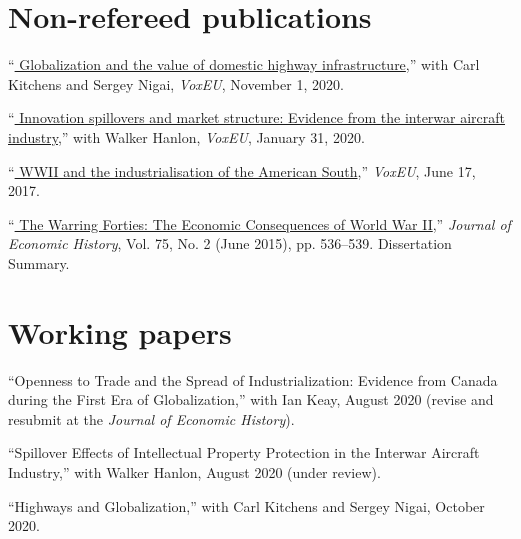 \documentclass[11pt,letterpaper]{article}
\begin{document}
\section*{Non-refereed publications}
\begin{description}[leftmargin=0in,itemsep=.25em,itemindent=.15in]
\item ``\href{https://voxeu.org/article/globalisation-and-value-domestic-highway-infrastructure}{\color{black}
		Globalization and the value of domestic highway infrastructure},''	
		with Carl Kitchens and Sergey Nigai, \emph{VoxEU}, November 1, 2020.
				
\item ``\href{https://voxeu.org/article/innovation-spillovers-and-market-structure}{\color{black}
		Innovation spillovers and market structure: Evidence from the interwar aircraft industry},'' 
		with Walker Hanlon, \emph{VoxEU}, January 31, 2020.
	
\item ``\href{https://voxeu.org/article/wwii-and-industrialisation-american-south}{\color{black}
		WWII and the industrialisation of the American South},'' 
		\emph{VoxEU}, June 17, 2017.	
	
\item 	``\href{https://doi.org/10.1017/S0022050717000791}{\color{black}
			The Warring Forties: The Economic Consequences of World War II},'' 
			\emph{Journal of Economic History}, Vol. 75, No. 2 (June 2015), pp. 536--539. Dissertation Summary.
\end{description}

\vspace{-1em}
\section*{Working papers}

\begin{description}[leftmargin=0in,itemsep=.25em,itemindent=.15in]
\item ``Openness to Trade and the Spread of Industrialization: Evidence from Canada during the First Era of Globalization,'' with Ian Keay, August 2020 (revise and resubmit at the \emph{Journal of Economic History}).

\item ``Spillover Effects of Intellectual Property Protection in the Interwar Aircraft Industry,'' with Walker Hanlon, August 2020 (under review).

\item ``Highways and Globalization,'' with Carl Kitchens and Sergey Nigai, October 2020.

\end{description} 
\end{document}
